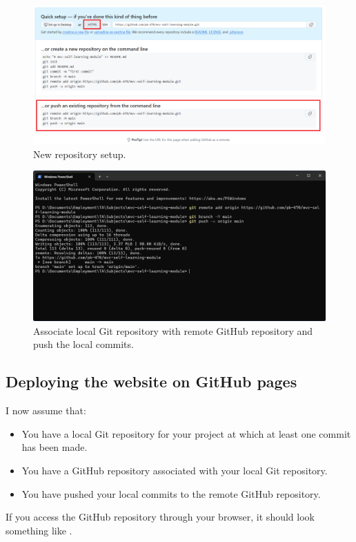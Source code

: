 \documentclass[a4paper,10pt]{article}
\begin{document}
\begin{figure}[htbp]
    \centering
    \includegraphics[width=\textwidth]{new_repository_setup.png}
    \caption{New repository setup.}
    \label{fig:new_repository_setup}   
\end{figure}

\begin{figure}[htbp]
    \centering
    \includegraphics[width=\textwidth]{git_remote_add_origin.png}
    \caption{Associate local Git repository with remote GitHub repository and push the local commits.}
    \label{fig:git_remote_add_origin}   
\end{figure}

\subsection{Deploying the website on GitHub pages}

I now assume that:
\begin{itemize}
    \item You have a local Git repository for your project at which at least one commit has been made.
    \item You have a GitHub repository associated with your local Git repository.
    \item You have pushed your local commits to the remote GitHub repository.
\end{itemize}
If you access the GitHub repository through your browser, it should look something like .
\end{document}
